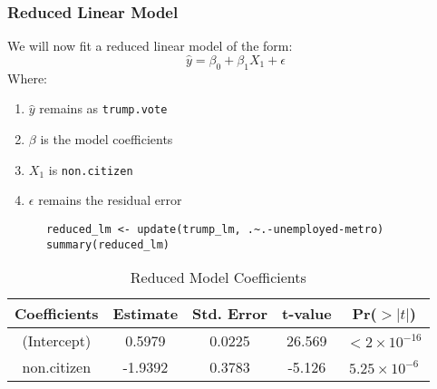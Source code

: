 \documentclass{article}
\theoremstyle{mytheoremstyle}
\theoremstyle{mytheoremstyle}
\theoremstyle{myproblemstyle}
\begin{document}
      \subsubsection{Reduced Linear Model}
      We will now fit a reduced linear model of the form:
      \[\hat{y} = \beta_0 + \beta_1 X_1 + \epsilon\]
      Where:
      \begin{enumerate}
        \item \(\hat{y}\) remains as \verb|trump.vote|
        \item \(\beta\) is the model coefficients
        \item \(X_1\) is \verb|non.citizen|
        \item \(\epsilon\) remains the residual error
      \end{enumerate}
      \vspace{0.1in}
      \begin{lstlisting}
      reduced_lm <- update(trump_lm, .~.-unemployed-metro)
      summary(reduced_lm)
      \end{lstlisting}
      \vspace{0.1in}
      \begin{table}[H]
        \centering
        \caption{Reduced Model Coefficients}\label{tab:coeff_reduced}
        \vspace{0.05in}
        \begin{tabular}{ccccc}
          \toprule
          Coefficients & Estimate & Std. Error & t-value & Pr($>|t|$) \\ %
          \midrule
          (Intercept) & 0.5979 & 0.0225 & 26.569 & \(< 2 \times 10^{-16}\) \\ 
          non.citizen & -1.9392 & 0.3783 & -5.126 & \(5.25 \times 10^{-6}\) \\
          \bottomrule
        \end{tabular}
      \end{table}
      
 
\end{document}
